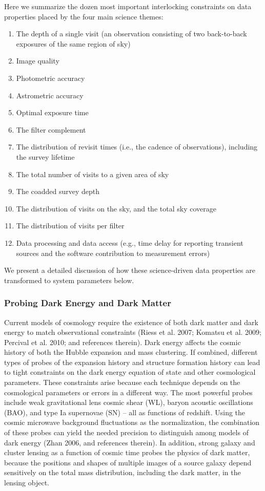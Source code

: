 \documentclass{emulateapj}
\newcommand{\R}[1]{{\color{red}}}
\begin{document}
Here we summarize the dozen most important interlocking constraints on data 
properties placed by the four main science themes: 

\begin{enumerate}
\item  The depth of a single visit (an observation consisting of two back-to-back 
         exposures of the same region of sky) 
\item  Image quality
\item  Photometric accuracy
\item  Astrometric accuracy
\item  Optimal exposure time
\item  The filter complement
\item  The distribution of revisit times (i.e., the cadence of observations),
       including the survey lifetime
\item  The total number of visits to a given area of sky
\item  The coadded survey depth
\item  The distribution of visits on the sky, and the total sky coverage
\item  The distribution of visits per filter
\item  Data processing and data access (e.g., time delay for reporting
         transient sources and the software contribution to measurement errors)
\end{enumerate}

We present a detailed discussion of how these science-driven data properties are
transformed to system parameters below. 

\subsubsection{Probing Dark Energy and Dark Matter}

Current models of cosmology require the existence of both dark matter and dark
energy to match observational constraints (Riess et al. 2007; Komatsu et al. 2009; 
Percival et al. 2010; and references therein). Dark energy affects
the cosmic history of both the Hubble expansion and mass clustering. If combined, 
different types of probes of the expansion history and structure formation history can lead 
to tight constraints \R{(a percent level precision)} on the dark energy equation of state 
and other cosmological parameters. These \R{tight} constraints arise  
because each technique depends on the cosmological parameters or errors in a different 
way. The most powerful probes include weak gravitational lens cosmic shear (WL), baryon 
acoustic oscillations (BAO), and type Ia supernovae (SN) -- all as functions of 
redshift. Using the cosmic microwave background fluctuations as the normalization, the combination 
of these probes can yield the needed precision to distinguish among models of dark 
energy (Zhan 2006, and references therein). In addition, strong galaxy 
and cluster lensing as a function of cosmic time probes the physics of dark matter,
because the positions and shapes of multiple images of a source galaxy 
depend sensitively on the total mass distribution, including the dark matter,
in the lensing object.
\end{document}
